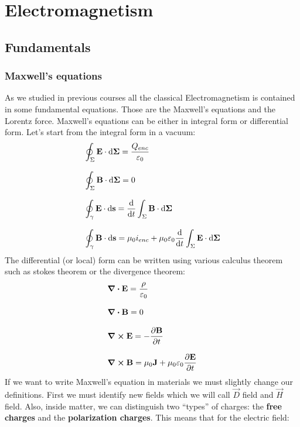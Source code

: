 \part{Electromagnetism}
\chapter{Fundamentals}
\section{Maxwell's equations}
As we studied in previous courses all the classical Electromagnetism is contained in some fundamental equations. Those are the Maxwell's equations and the Lorentz force. Maxwell's equations can be either in integral form or differential form. Let's start from the integral form in a vacuum:
\begin{equation} \label{e:int_Maxwell_eq}
  \begin{split}
    &\oint_{\Sigma} \vec{E} \cdot \dd{\vec{\Sigma}} = \dfrac{Q_{enc}}{\epsz}\\[8pt]
    &\oint_{\Sigma} \vec{B} \cdot \dd{\vec{\Sigma}} = 0\\[8pt]
    &\oint_{\gamma} \vec{E} \cdot \dd{\vec{s}} = \dv{}{t}\int_{\Sigma} \vec{B} \cdot \dd{\vec{\Sigma}}\\[8pt]
    &\oint_{\gamma} \vec{B} \cdot \dd{\vec{s}} = \muz i_{enc} + \muz \epsz \dv{}{t}\int_{\Sigma} \vec{E} \cdot \dd{\vec{\Sigma}}
  \end{split}
\end{equation}
The differential (or local) form can be written using various calculus theorem such as stokes theorem or the divergence theorem:
\begin{equation} \label{e:diff_Maxwell_eq}
  \begin{split}
    &\div{\vec{E}} = \dfrac{\rho}{\epsz}\\[8pt]
    &\div{\vec{B}} = 0\\[8pt]
    &\curl{\vec{E}} = -\pdv{\vec{B}}{t}\\[8pt]
    &\curl{\vec{B}} = \muz \vec{J} + \muz \epsz \pdv{\vec{E}}{t}
  \end{split}
\end{equation}
If we want to write Maxwell's equation in materials we must slightly change our definitions. First we must identify new fields which we will call $\vec{D}$ field and $\vec{H}$ field.
Also, inside matter, we can distinguish two ``types'' of charges: the \textbf{free charges} and the \textbf{polarization charges}. This means that for the electric field:
